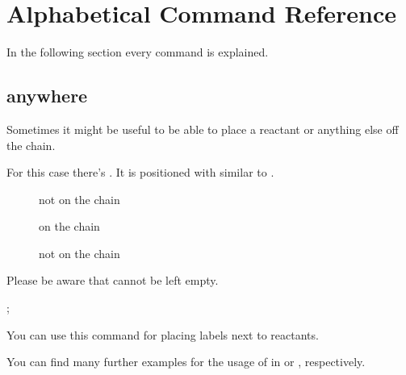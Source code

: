 \documentclass[toc=index,DIV10]{cnpkgdoc}
\begin{document}
\section{Alphabetical Command Reference}
In the following section every command is explained.

\subsection{anywhere}\label{ssec:anywhere}
Sometimes it might be useful to be able to place a reactant or anything else off
the chain.
\begin{beschreibung}
\end{beschreibung}
For this case there's . It is positioned with  similar
to .
\begin{description}
 \item[] not on the chain
 \item[] on the chain
 \item[] not on the chain
\end{description}
Please be aware that  cannot be left empty.

\begin{beispiel}
 \begin{rxn}
  ;
 \end{rxn}
\end{beispiel}
You can use this command \eg for placing labels next to reactants.
\begin{beispiel}
 \begin{rxn}
 \end{rxn}
\end{beispiel}
You can find many further examples for the usage of  in 
or , respectively.
\end{document}
